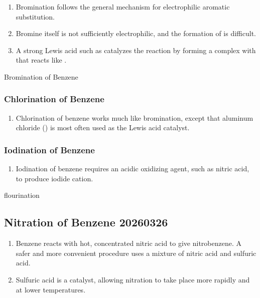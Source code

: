 \begin{enumerate}
    \item Bromination follows the general mechanism for electrophilic aromatic substitution.
    \item Bromine itself is not sufficiently electrophilic, and the formation of  is difficult.
    \item A strong Lewis acid such as catalyzes the reaction by forming a complex with  that reacts like .
\end{enumerate}

\begin{mechanism}
    Bromination of Benzene
\end{mechanism}

\subsubsection{Chlorination of Benzene}

\begin{enumerate}
    \item Chlorination of benzene works much like bromination, except that aluminum chloride () is most often used as the Lewis acid catalyst.
\end{enumerate}

\subsubsection{Iodination of Benzene}

\begin{enumerate}
    \item Iodination of benzene requires an acidic oxidizing agent, such as nitric acid, to produce iodide cation.
\end{enumerate}

\begin{example}
    flourination
\end{example}

\subsection{Nitration of Benzene 20260326}

\begin{enumerate}
    \item Benzene reacts with hot, concentrated nitric acid to give nitrobenzene. A safer and more convenient procedure uses a mixture of nitric acid and sulfuric acid.
    \item Sulfuric acid is a catalyst, allowing nitration to take place more rapidly and at lower temperatures.
\end{enumerate}

